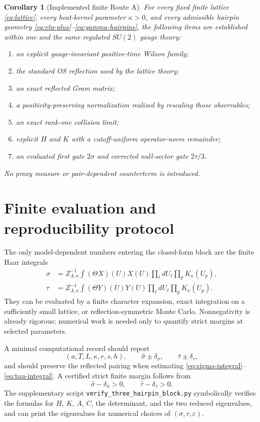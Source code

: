 \documentclass[11pt]{article}
\newtheorem{corollary}[theorem]{Corollary}
\newcommand{\eps}{\varepsilon}
\begin{document}
\begin{corollary}[Implemented finite Route A]
\label{cor:implemented-route-a}
For every fixed finite lattice \eqref{eq:lattice}, every heat-kernel parameter $\kappa>0$, and every admissible hairpin geometry \eqref{eq:eta-plus}--\eqref{eq:gamma-hairpins}, the following items are established within one and the same regulated $SU(2)$ gauge theory:
\begin{enumerate}[label=(\roman*)]
  \item an explicit gauge-invariant positive-time Wilson family;
  \item the standard OS reflection used by the lattice theory;
  \item an exact reflected Gram matrix;
  \item a positivity-preserving normalization realized by rescaling those observables;
  \item an exact rank-one collision limit;
  \item explicit $H$ and $K$ with a cutoff-uniform operator-norm remainder;
  \item an evaluated first gate $2\sigma$ and corrected null-sector gate $2\tau/3$.
\end{enumerate}
No proxy measure or pair-dependent counterterm is introduced.
\end{corollary}

\section{Finite evaluation and reproducibility protocol}
\label{sec:protocol}

The only model-dependent numbers entering the closed-form block are the finite Haar integrals
\begin{align}
  \sigma
  &=Z_{\Lambda,\kappa}^{-1}
  \int (\Theta X)(U)X(U)
  \prod_{\ell}dU_\ell
  \prod_pK_\kappa(U_p),
  \label{eq:sigma-integral}\\
  \tau
  &=Z_{\Lambda,\kappa}^{-1}
  \int (\Theta Y)(U)Y(U)
  \prod_{\ell}dU_\ell
  \prod_pK_\kappa(U_p).
  \label{eq:tau-integral}
\end{align}
They can be evaluated by a finite character expansion, exact integration on a sufficiently small lattice, or reflection-symmetric Monte Carlo.  Nonnegativity is already rigorous; numerical work is needed only to quantify strict margins at selected parameters.

A minimal computational record should report
\[
  (a,T,L,\kappa,r,s,h),
  \qquad
  \widehat\sigma\pm\delta_\sigma,
  \qquad
  \widehat\tau\pm\delta_\tau,
\]
and should preserve the reflected pairing when estimating \eqref{eq:sigma-integral}--\eqref{eq:tau-integral}.  A certified strict finite margin follows from
\begin{equation}
  \widehat\sigma-\delta_\sigma>0,
  \qquad
  \widehat\tau-\delta_\tau>0.
  \label{eq:certified-strictness}
\end{equation}
The supplementary script \texttt{verify\_three\_hairpin\_block.py} symbolically verifies the formulas for $H$, $K$, $A$, $C$, the determinant, and the two reduced eigenvalues, and can print the eigenvalues for numerical choices of $(\sigma,\tau,\eps)$.
\end{document}
